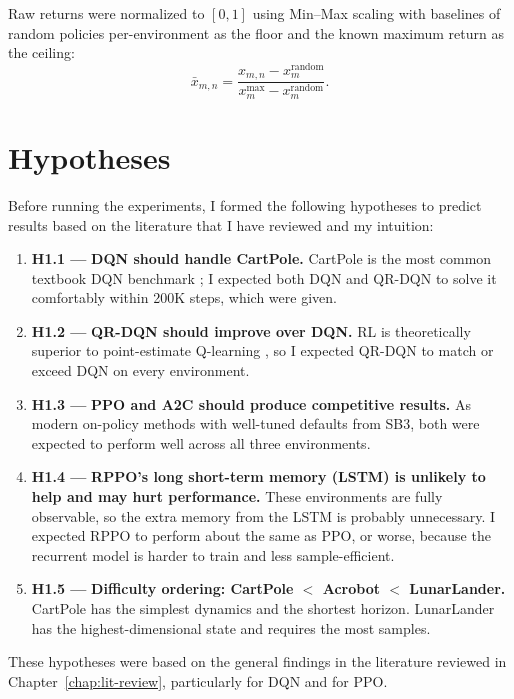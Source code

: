 Raw returns were normalized to $[0, 1]$ using Min--Max scaling with
baselines of random policies per-environment as the floor and the known maximum return as the ceiling:
\[
  \bar{x}_{m,n} = \frac{x_{m,n} - x^{\text{random}}_m}
                       {x^{\max}_m - x^{\text{random}}_m}.
\]


\section{Hypotheses}
\label{sec:hypotheses}

Before running the experiments, I formed the following hypotheses to predict results based
on the literature that I have reviewed and my intuition:

\begin{enumerate}

    \item {\color{red} \textbf{H1.1 ---}} \textbf{DQN should handle CartPole.}
    CartPole is the most common textbook DQN benchmark \citep{mnih2015human};
    I expected both DQN and QR-DQN to solve it comfortably within
    200K steps, which were given.

    \item {\color{red} \textbf{H1.2 ---}} \textbf{QR-DQN should improve over DQN.}
    RL is theoretically superior to point-estimate
    Q-learning \citep{dabney2018qrdqn}, so I expected QR-DQN to
    match or exceed DQN on every environment.

    \item {\color{red} \textbf{H1.3 ---}} \textbf{PPO and A2C should produce competitive results.}
    As modern on-policy methods with well-tuned defaults from SB3,
    both were expected to perform well across all three environments.

    \item {\color{red} \textbf{H1.4 ---}} \textbf{RPPO's long short-term memory (LSTM) is unlikely to help and may hurt performance.}
    These environments are fully observable, so the extra memory from the LSTM is probably unnecessary. I expected RPPO to perform about the same as PPO, or worse, because the recurrent model is harder to train and less sample-efficient.

    \item {\color{red} \textbf{H1.5 ---}} \textbf{Difficulty ordering: CartPole $<$ Acrobot $<$ LunarLander.}
    CartPole has the simplest dynamics and the shortest horizon.
    LunarLander has the highest-dimensional state and requires
    the most samples.
    
\end{enumerate}
These hypotheses were based on the general findings in the literature reviewed in Chapter~\ref{chap:lit-review}, particularly \citet{mnih2015human} for DQN and \citet{schulman2017ppo} for PPO.


